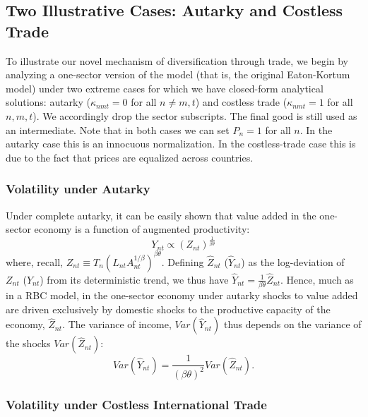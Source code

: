 \documentclass[12pt]{article}
\begin{document}
\subsection{Two Illustrative Cases: Autarky and Costless Trade}

To illustrate our novel mechanism of diversification through trade, we begin
by analyzing a one-sector version of the model (that is, the original
Eaton-Kortum model) under two extreme cases for which we have closed-form
analytical solutions: autarky ($\kappa _{nmt}=0$ for all $n\neq m,t$) and
costless trade ($\kappa _{nmt}=1$ for all $n,m,t$). We accordingly drop the
sector subscripts. The final good is still used as an intermediate. Note
that in both cases we can set $P_{n}=1$ for all $n$. In the autarky case
this is an innocuous normalization. In the costless-trade case this is due
to the fact that prices are equalized across countries.

\subsubsection{Volatility under Autarky}

Under complete autarky, it can be easily shown that value added in the
one-sector economy is a function of augmented productivity: 
\begin{equation*}
Y_{nt}\propto \left( Z_{nt}\right) ^{\frac{1}{\beta \theta }}
\end{equation*}%
where, recall, $Z_{nt}\equiv T_{n}\left( L_{nt}A_{nt}^{1/\beta }\right)
^{\beta \theta }$. Defining $\hat{Z}_{nt}$ ($\hat{Y}_{nt}$) as the
log-deviation of $Z_{nt}$ ($Y_{nt}$) from its deterministic trend, we thus
have $\hat{Y}_{nt}=\frac{1}{\beta \theta }\hat{Z}_{nt}.$ Hence, much as in a
RBC model, in the one-sector economy under autarky shocks to value added are
driven exclusively by domestic shocks to the productive capacity of the
economy, $\hat{Z}_{nt}.$ The variance of income, $Var(\hat{Y}_{nt})$ thus
depends on the variance of the shocks $Var(\hat{Z}_{nt})$: 
\begin{equation*}
Var(\hat{Y}_{nt})=\frac{1}{\left( \beta \theta \right) ^{2}}Var(\hat{Z}%
_{nt}).
\end{equation*}

\subsubsection{Volatility under Costless International Trade}
\end{document}
